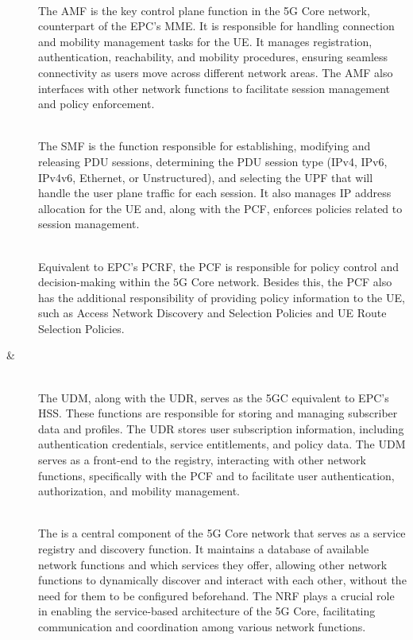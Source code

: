 \begin{description}
  \item[{\normalfont{}}]~\\
  The \gls{AMF} is the key control plane function in the 5G Core network, counterpart of the \gls{EPC}'s  \gls{MME}. It is responsible for handling connection and mobility management tasks for the \gls{UE}. It manages registration, authentication, reachability, and mobility procedures, ensuring seamless connectivity as users move across different network areas. The \gls{AMF} also interfaces with other network functions to facilitate session management and policy enforcement.

  \item[{\normalfont{}}]~\\
  The \gls{SMF} is the function responsible for establishing, modifying and releasing \gls{PDU} sessions, determining the \gls{PDU} session type (IPv4, IPv6, IPv4v6, Ethernet, or Unstructured), and selecting the \gls{UPF} that will handle the user plane traffic for each session. It also manages IP address allocation for the \gls{UE} and, along with the \gls{PCF}, enforces policies related to session management.

  \item[{\normalfont{}}]~\\
  Equivalent to \gls{EPC}'s \gls{PCRF}, the \gls{PCF} is responsible for policy control and decision-making within the 5G Core network. Besides this, the \gls{PCF} also has the additional responsibility of providing policy information to the \gls{UE}, such as Access Network Discovery and Selection Policies and \gls{UE} Route Selection Policies.

  \item[{\normalfont{} \& }]~\\
  The \gls{UDM}, along with the \gls{UDR}, serves as the \gls{5GC} equivalent to \gls{EPC}'s \gls{HSS}. These functions are responsible for storing and managing subscriber data and profiles. The \gls{UDR} stores user subscription information, including authentication credentials, service entitlements, and policy data. The \gls{UDM} serves as a front-end to the registry, interacting with other network functions, specifically with the \gls{PCF} and  to facilitate user authentication, authorization, and mobility management.

  \item[{\normalfont{}}]~\\
  The  is a central component of the 5G Core network that serves as a service registry and discovery function. It maintains a database of available network functions and which services they offer, allowing other network functions to dynamically discover and interact with each other, without the need for them to be configured beforehand. The \gls{NRF} plays a crucial role in enabling the service-based architecture of the 5G Core, facilitating communication and coordination among various network functions.


\end{description}
